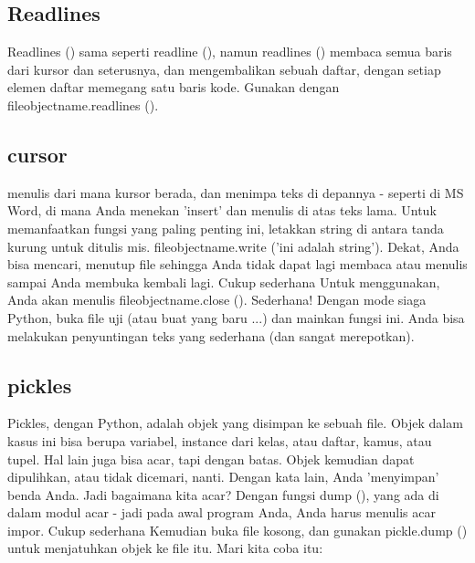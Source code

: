 \subsection{Readlines}
Readlines () sama seperti readline (), namun readlines () membaca semua baris dari kursor dan seterusnya, dan mengembalikan sebuah daftar, dengan setiap elemen daftar memegang satu baris kode. Gunakan dengan fileobjectname.readlines (). 

\subsection{cursor}
menulis dari mana kursor berada, dan menimpa teks di depannya - seperti di MS Word, di mana Anda menekan 'insert' dan menulis di atas teks lama. Untuk memanfaatkan fungsi yang paling penting ini, letakkan string di antara tanda kurung untuk ditulis mis. fileobjectname.write ('ini adalah string'). \hspace*{0.5in} Dekat, Anda bisa mencari, menutup file sehingga Anda tidak dapat lagi membaca atau menulis sampai Anda membuka kembali lagi. Cukup sederhana Untuk menggunakan, Anda akan menulis fileobjectname.close (). Sederhana! Dengan mode siaga Python, buka file uji (atau buat yang baru ...) dan mainkan fungsi ini. Anda bisa melakukan penyuntingan teks yang sederhana (dan sangat merepotkan).

\subsection{pickles}
Pickles, dengan Python, adalah objek yang disimpan ke sebuah file. Objek dalam kasus ini bisa berupa variabel, instance dari kelas, atau daftar, kamus, atau tupel. Hal lain juga bisa acar, tapi dengan batas. Objek kemudian dapat dipulihkan, atau tidak dicemari, nanti. Dengan kata lain, Anda 'menyimpan' benda Anda. Jadi bagaimana kita acar? Dengan fungsi dump (), yang ada di dalam modul acar - jadi pada awal program Anda, Anda harus menulis acar impor. Cukup sederhana Kemudian buka file kosong, dan gunakan pickle.dump () untuk menjatuhkan objek ke file itu. Mari kita coba itu:



